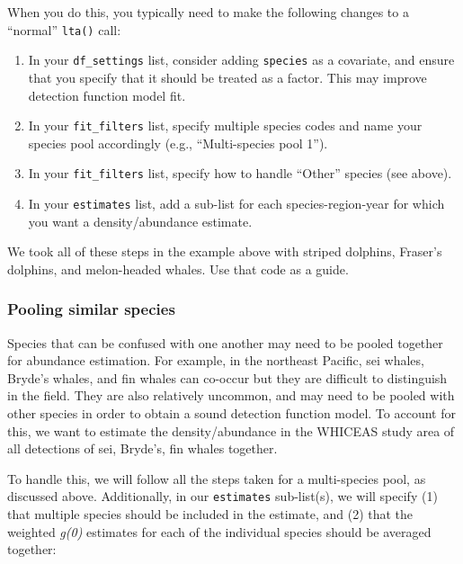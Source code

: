 \documentclass[
]{book}
\begin{document}
When you do this, you typically need to make the following changes to a ``normal'' \texttt{lta()} call:

\begin{enumerate}
\def\labelenumi{(\arabic{enumi})}
\item
  In your \texttt{df\_settings} list, consider adding \texttt{species} as a covariate, and ensure that you specify that it should be treated as a factor. This may improve detection function model fit.
\item
  In your \texttt{fit\_filters} list, specify multiple species codes and name your species pool accordingly (e.g., ``Multi-species pool 1'').
\item
  In your \texttt{fit\_filters} list, specify how to handle ``Other'' species (see above).
\item
  In your \texttt{estimates} list, add a sub-list for each species-region-year for which you want a density/abundance estimate.
\end{enumerate}

We took all of these steps in the example above with striped dolphins, Fraser's dolphins, and melon-headed whales. Use that code as a guide.

\hypertarget{pooling-similar-species}{%
\subsubsection*{Pooling similar species}\label{pooling-similar-species}}

Species that can be confused with one another may need to be pooled together for abundance estimation. For example, in the northeast Pacific, sei whales, Bryde's whales, and fin whales can co-occur but they are difficult to distinguish in the field. They are also relatively uncommon, and may need to be pooled with other species in order to obtain a sound detection function model. To account for this, we want to estimate the density/abundance in the WHICEAS study area of all detections of sei, Bryde's, fin whales together.

To handle this, we will follow all the steps taken for a multi-species pool, as discussed above. Additionally, in our \texttt{estimates} sub-list(s), we will specify (1) that multiple species should be included in the estimate, and (2) that the weighted \emph{g(0)} estimates for each of the individual species should be averaged together:
\end{document}
